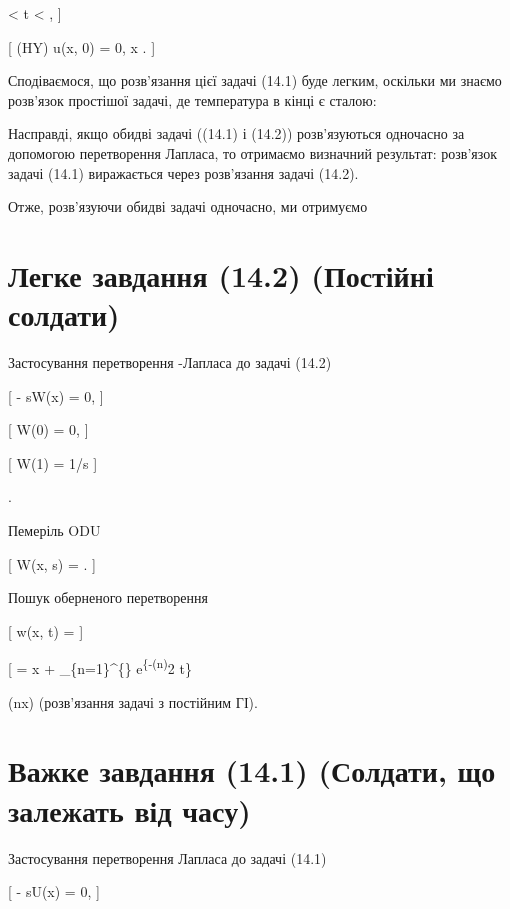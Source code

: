 \documentclass[
  ukrainian,
]{article}
\begin{document}
 \textless{} t \textless{} \infty, {]}

{[} (HY) \quad u(x, 0) = 0,  \le x . {]}

Сподіваємося, що розв'язання цієї задачі (14.1) буде легким, оскільки ми
знаємо розв'язок простішої задачі, де температура в кінці є сталою:

Насправді, якщо обидві задачі ((14.1) і (14.2)) розв'язуються одночасно
за допомогою перетворення Лапласа, то отримаємо визначний результат:
розв'язок задачі (14.1) виражається через розв'язання задачі (14.2).

Отже, розв'язуючи обидві задачі одночасно, ми отримуємо

\section{Легке завдання (14.2) (Постійні
солдати)}\label{ux43bux435ux433ux43aux435-ux437ux430ux432ux434ux430ux43dux43dux44f-14.2-ux43fux43eux441ux442ux456ux439ux43dux456-ux441ux43eux43bux434ux430ux442ux438}

Застосування перетворення -Лапласа до задачі (14.2)

{[}  - sW(x) = 0, {]}

{[} W(0) = 0, {]}

{[} W(1) = 1/s {]}

.

Пемеріль ODU

{[} W(x, s) = 
. {]}

Пошук оберненого перетворення

{[} w(x, t) = {]}

{[} = x +  \sum\_\{n=1\}\^{}\{\infty\} 
e\textsuperscript{\{-(n\pi)}2 t\} \times {]}

\times \sin(n\pi x) (розв'язання задачі з постійним ГІ).

\section{Важке завдання (14.1) (Солдати, що залежать від
часу)}\label{ux432ux430ux436ux43aux435-ux437ux430ux432ux434ux430ux43dux43dux44f-14.1-ux441ux43eux43bux434ux430ux442ux438-ux449ux43e-ux437ux430ux43bux435ux436ux430ux442ux44c-ux432ux456ux434-ux447ux430ux441ux443}

Застосування перетворення Лапласа до задачі (14.1)

{[}  - sU(x) = 0, {]}
\end{document}
